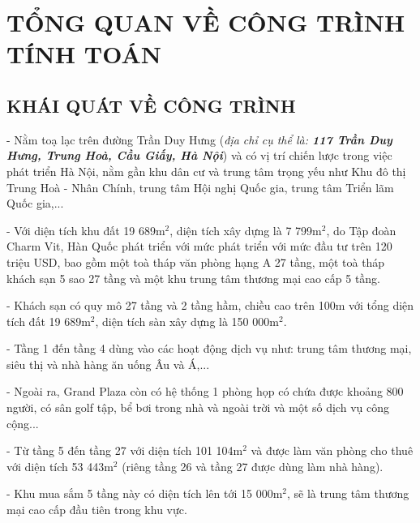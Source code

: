 \setlength{\parindent}{1cm}


\newpage
\chapter{\textbf{TỔNG QUAN VỀ CÔNG TRÌNH TÍNH TOÁN}}
\newpage

	\section{KHÁI QUÁT VỀ CÔNG TRÌNH}
	- Nằm toạ lạc trên đường Trần Duy Hưng (\emph{địa chỉ cụ thể là: \textbf{117 Trần Duy Hưng, Trung Hoà, Cầu Giấy, Hà Nội}}) và có vị trí chiến lược trong việc phát triển Hà Nội, nằm gần khu dân cư và trung tâm trọng yếu như Khu đô thị Trung Hoà - Nhân Chính, trung tâm Hội nghị Quốc gia, trung tâm Triển lãm Quốc gia,...
	
	- Với diện tích khu đất 19 689m$^{2}$, diện tích xây dựng là 7 799m$^{2}$, do Tập đoàn Charm Vit, Hàn Quốc phát triển với mức phát triển với mức đầu tư trên 120 triệu USD, bao gồm một toà tháp văn phòng hạng A 27 tầng, một toà tháp khách sạn 5 sao 27 tầng và một khu trung tâm thương mại cao cấp 5 tầng.

	- Khách sạn có quy mô 27 tầng và 2 tầng hầm, chiều cao trên 100m với tổng diện tích đất 19 689m$^{2}$, diện tích sàn xây dựng là 150 000m$^{2}$.
	
	- Tầng 1 đến tầng 4 dùng vào các hoạt động dịch vụ như: trung tâm thương mại, siêu thị và nhà hàng ăn uống Âu và Á,...
	
	- Ngoài ra, Grand Plaza còn có hệ thống 1 phòng họp có chứa được khoảng 800 người, có sân golf tập, bể bơi trong nhà và ngoài trời và một số dịch vụ công cộng...
		
	- Từ tầng 5 đến tầng 27 với diện tích 101 104m$^{2}$ và được làm văn phòng cho thuê với diện tích 53 443m$^{2}$ (riêng tầng 26 và tầng 27 được dùng làm nhà hàng).	
		
	- Khu mua sắm 5 tầng này có diện tích lên tới 15 000m$^{2}$, sẽ là trung tâm thương mại cao cấp đầu tiên trong khu vực.
	
